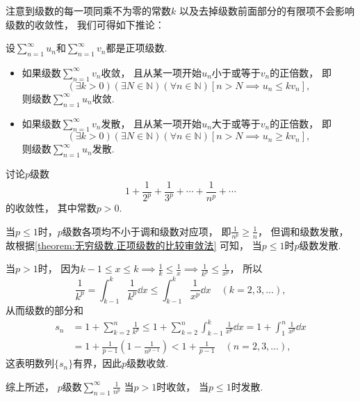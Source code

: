注意到级数的每一项同乘不为零的常数\(k\)
以及去掉级数前面部分的有限项不会影响级数的收敛性，
我们可得如下推论：
\begin{corollary}\label{theorem:无穷级数.正项级数的比较审敛法的推论}
设\(\sum_{n=1}^\infty u_n\)和\(\sum_{n=1}^\infty v_n\)都是正项级数.
\begin{itemize}
	\item 如果级数\(\sum_{n=1}^\infty v_n\)收敛，
	且从某一项开始\(u_n\)小于或等于\(v_n\)的正倍数，
	即\[
		(\exists k>0)
		(\exists N\in\mathbb{N})
		(\forall n\in\mathbb{N})
		[
			n > N
			\implies
			u_n \leq k v_n
		],
	\]
	则级数\(\sum_{n=1}^\infty u_n\)收敛.

	\item 如果级数\(\sum_{n=1}^\infty v_n\)发散，
	且从某一项开始\(u_n\)大于或等于\(v_n\)的正倍数，
	即\[
		(\exists k>0)
		(\exists N\in\mathbb{N})
		(\forall n\in\mathbb{N})
		[
			n > N
			\implies
			u_n \geq k v_n
		],
	\]
	则级数\(\sum_{n=1}^\infty u_n\)发散.
\end{itemize}
\end{corollary}

\begin{example}\label{example:无穷级数.p级数的收敛性}
讨论\(p\)级数\[
	1+\frac{1}{2^p}+\frac{1}{3^p}+\dotsb+\frac{1}{n^p}+\dotsb
\]的收敛性，
其中常数\(p>0\).
\begin{solution}
当\(p \leq 1\)时，\(p\)级数各项均不小于调和级数对应项，
即\(\frac{1}{n^p} \geq \frac{1}{n}\)，
但调和级数发散，
故根据\cref{theorem:无穷级数.正项级数的比较审敛法} 可知，
当\(p \leq 1\)时\(p\)级数发散.

当\(p > 1\)时，
因为\(k-1
\leq x
\leq k \implies \frac{1}{k}
\leq \frac{1}{x} \implies \frac{1}{k^p}
\leq \frac{1}{x^p}\)，
所以\[
	\frac{1}{k^p}
	= \int_{k-1}^k \frac{1}{k^p} \dd{x}
	\leq \int_{k-1}^k \frac{1}{x^p} \dd{x}
	\quad(k=2,3,\dotsc),
\]
从而级数的部分和
\begin{align*}
	s_n &= 1 + \sum_{k=2}^n{\frac{1}{k^p}}
	\leq 1 + \sum_{k=2}^n{ \int_{k-1}^k{\frac{1}{x^p}\dd{x}} }
	= 1 + \int_1^n{\frac{1}{x^p}\dd{x}} \\
	&= 1 + \frac{1}{p-1}\left(1-\frac{1}{n^{p-1}}\right)
	< 1 + \frac{1}{p-1}
	\quad(n=2,3,\dotsc),
\end{align*}
这表明数列\(\{s_n\}\)有界，因此\(p\)级数收敛.

综上所述，{\color{red} \(p\)级数\(\sum_{n=1}^\infty \frac{1}{n^p}\)
当\(p > 1\)时收敛，
当\(p \leq 1\)时发散.}
\end{solution}
\end{example}

